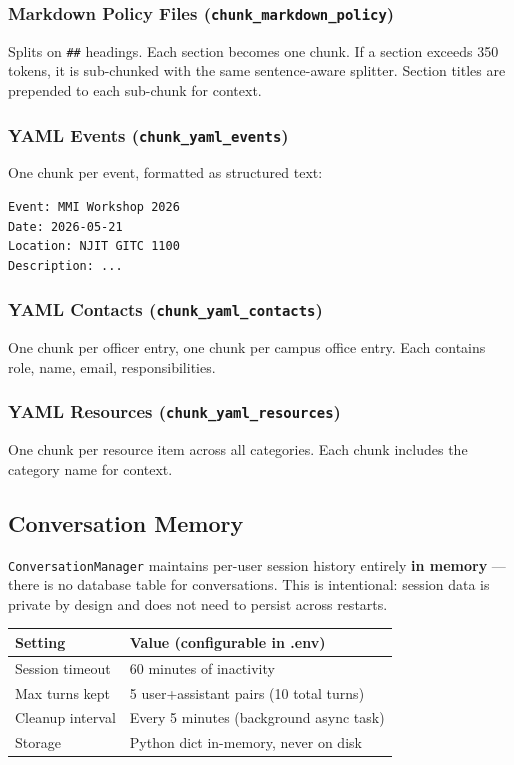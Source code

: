 \documentclass[12pt,letterpaper]{article}
\begin{document}
\subsubsection{Markdown Policy Files (\texttt{chunk\_markdown\_policy})}

Splits on \texttt{\#\#} headings. Each section becomes one chunk. If a section
exceeds 350 tokens, it is sub-chunked with the same sentence-aware splitter.
Section titles are prepended to each sub-chunk for context.

\subsubsection{YAML Events (\texttt{chunk\_yaml\_events})}

One chunk per event, formatted as structured text:
\begin{lstlisting}[numbers=none]
Event: MMI Workshop 2026
Date: 2026-05-21
Location: NJIT GITC 1100
Description: ...
\end{lstlisting}

\subsubsection{YAML Contacts (\texttt{chunk\_yaml\_contacts})}

One chunk per officer entry, one chunk per campus office entry. Each contains
role, name, email, responsibilities.

\subsubsection{YAML Resources (\texttt{chunk\_yaml\_resources})}

One chunk per resource item across all categories. Each chunk includes the
category name for context.

\subsection{Conversation Memory}

\texttt{ConversationManager} maintains per-user session history entirely
\textbf{in memory} — there is no database table for conversations. This is
intentional: session data is private by design and does not need to persist
across restarts.

\begin{center}
\begin{tabular}{ll}
\toprule
\textbf{Setting} & \textbf{Value (configurable in .env)} \\
\midrule
Session timeout & 60 minutes of inactivity \\
Max turns kept & 5 user+assistant pairs (10 total turns) \\
Cleanup interval & Every 5 minutes (background async task) \\
Storage & Python dict in-memory, never on disk \\
\bottomrule
\end{tabular}
\end{center}
\end{document}
